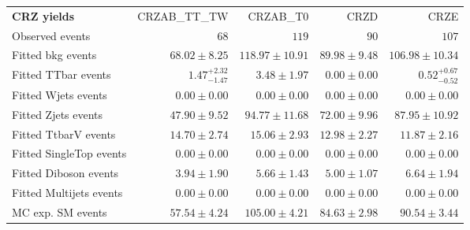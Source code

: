 

\begin{table}
\begin{center}
\setlength{\tabcolsep}{0.0pc}
{\small
\begin{tabular*}{\textwidth}{@{\extracolsep{\fill}}lrrrr}
\noalign{\smallskip}\hline\noalign{\smallskip}
{\bf CRZ yields}           & CRZAB\_TT\_TW            & CRZAB\_T0            & CRZD            & CRZE              \\[-0.05cm]
\noalign{\smallskip}\hline\noalign{\smallskip}
Observed events          & $68$              & $119$              & $90$              & $107$                    \\
\noalign{\smallskip}\hline\noalign{\smallskip}
Fitted bkg events         & $68.02 \pm 8.25$          & $118.97 \pm 10.91$          & $89.98 \pm 9.48$          & $106.98 \pm 10.34$              \\
\noalign{\smallskip}\hline\noalign{\smallskip}
        Fitted TTbar events         & $1.47_{-1.47}^{+2.32}$          & $3.48 \pm 1.97$          & $0.00 \pm 0.00$          & $0.52_{-0.52}^{+0.67}$              \\
        Fitted Wjets events         & $0.00 \pm 0.00$          & $0.00 \pm 0.00$          & $0.00 \pm 0.00$          & $0.00 \pm 0.00$              \\
        Fitted Zjets events         & $47.90 \pm 9.52$          & $94.77 \pm 11.68$          & $72.00 \pm 9.96$          & $87.95 \pm 10.92$              \\
        Fitted TtbarV events         & $14.70 \pm 2.74$          & $15.06 \pm 2.93$          & $12.98 \pm 2.27$          & $11.87 \pm 2.16$              \\
        Fitted SingleTop events         & $0.00 \pm 0.00$          & $0.00 \pm 0.00$          & $0.00 \pm 0.00$          & $0.00 \pm 0.00$              \\
        Fitted Diboson events         & $3.94 \pm 1.90$          & $5.66 \pm 1.43$          & $5.00 \pm 1.07$          & $6.64 \pm 1.94$              \\
        Fitted Multijets events         & $0.00 \pm 0.00$          & $0.00 \pm 0.00$          & $0.00 \pm 0.00$          & $0.00 \pm 0.00$              \\
 \noalign{\smallskip}\hline\noalign{\smallskip}
MC exp. SM events              & $57.54 \pm 4.24$          & $105.00 \pm 4.21$          & $84.63 \pm 2.98$          & $90.54 \pm 3.44$              \\

\end{tabular*}}
\end{center}
\end{table}
